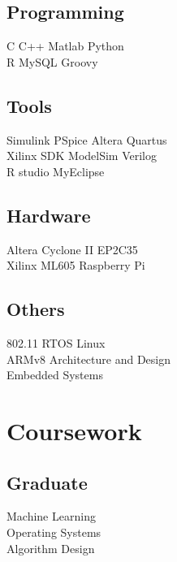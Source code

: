 \documentclass[letterpaper]{deedy-resume} %
\begin{document}
\begin{minipage}[t]{0.23\textwidth}
\subsection{Programming}
\footnotesize{C \textbullet{} C++ \textbullet{} Matlab \textbullet{}
Python \\ R \textbullet{} MySQL \textbullet{} Groovy\\}
\vspace{-1 mm}
\subsection{Tools}
Simulink \textbullet{} PSpice \textbullet{}
 Altera Quartus \\ Xilinx SDK \textbullet{}
 ModelSim \textbullet{} Verilog\\
R studio \textbullet{} MyEclipse\\
\vspace{-1 mm}
\subsection{Hardware}
Altera Cyclone II EP2C35 \\
Xilinx ML605 \textbullet{} Raspberry Pi\\
\vspace{-1 mm}
\subsection{Others}
802.11 \textbullet{} RTOS \textbullet{} Linux \\
ARMv8 Architecture and Design \textbullet{}\\
Embedded Systems\\


\section{Coursework}
\subsection{Graduate}
\textbullet{} Machine Learning \\
\textbullet{} Operating Systems \\
\textbullet{} Algorithm Design \\


\end{minipage}
\end{document}
